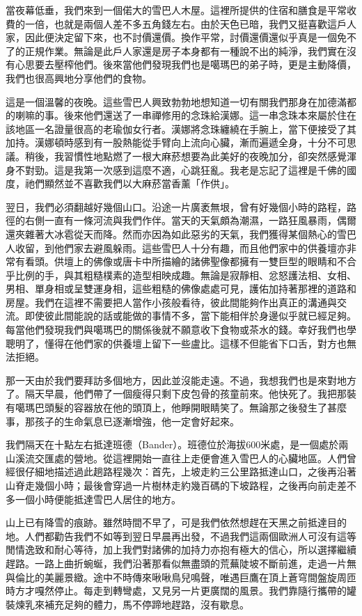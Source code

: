 當夜幕低垂，我們來到一個偌大的雪巴人木屋。這裡所提供的住宿和膳食是平常收費的一倍，也就是兩個人差不多五角錢左右。由於天色已暗，我們又挺喜歡這戶人家，因此便決定留下來，也不討價還價。換作平常，討價還價還似乎真是一個免不了的正規作業。無論是此戶人家還是房子本身都有一種說不出的純淨，我們實在沒有心思要去壓榨他們。後來當他們發現我們也是噶瑪巴的弟子時，更是主動降價，我們也很高興地分享他們的食物。

這是一個溫馨的夜晚。這些雪巴人興致勃勃地想知道一切有關我們那身在加德滿都的喇嘛的事。後來他們還送了一串禪修用的念珠給漢娜。這一串念珠本來屬於住在該地區一名證量很高的老瑜伽女行者。漢娜將念珠纏繞在手腕上，當下便接受了其加持。漢娜頓時感到有一股熱能從手臂向上流向心臟，漸而遍遞全身，十分不可思議。稍後，我習慣性地點燃了一根大麻菸想要為此美好的夜晚加分，卻突然感覺渾身不對勁。這是我第一次感到這麼不適，心跳狂亂。我老是忘記了這裡是千佛的國度，祂們顯然並不喜歡我們以大麻菸當香薰「作供」。

翌日，我們必須翻越好幾個山口。沿途一片廣袤無垠，曾有好幾個小時的路程，路徑的右側一直有一條河流與我們作伴。當天的天氣頗為潮濕，一路狂風暴雨，偶爾還夾雜著大冰雹從天而降。然而亦因為如此惡劣的天氣，我們獲得某個熱心的雪巴人收留，到他們家去避風躲雨。這些雪巴人十分有趣，而且他們家中的供養壇亦非常有看頭。供壇上的佛像或唐卡中所描繪的諸佛聖像都擁有一雙巨型的眼睛和不合乎比例的手，與其粗糙樸素的造型相映成趣。無論是寂靜相、忿怒護法相、女相、男相、單身相或呈雙運身相，這些粗糙的佛像處處可見，護佑加持著那裡的道路和房屋。我們在這裡不需要把人當作小孩般看待，彼此間能夠作出真正的溝通與交流。即使彼此間能說的話或能做的事情不多，當下能相伴於身邊似乎就已經足夠。每當他們發現我們與噶瑪巴的關係後就不願意收下食物或茶水的錢。幸好我們也學聰明了，懂得在他們家的供養壇上留下一些盧比。這樣不但能省下口舌，對方也無法拒絕。

那一天由於我們要拜訪多個地方，因此並沒能走遠。不過，我想我們也是來對地方了。隔天早晨，他們帶了一個瘦得只剩下皮包骨的孩童前來。他快死了。我把那裝有噶瑪巴頭髮的容器放在他的頭頂上，他睜開眼睛笑了。無論那之後發生了甚麼事，那孩子的生命氣息已逐漸增強，他一定會好起來。

我們隔天在十點左右抵達班德（Bander）。班德位於海拔600米處，是一個處於兩山溪流交匯處的營地。從這裡開始一直往上走便會進入雪巴人的心臟地區。人們曾經很仔細地描述過此趟路程幾次：首先，上坡走約三公里路抵達山口，之後再沿著山脊走幾個小時；最後會穿過一片樹林走約幾百碼的下坡路程，之後再向前走差不多一個小時便能抵達雪巴人居住的地方。

山上已有降雪的痕跡。雖然時間不早了，可是我們依然想趕在天黑之前抵達目的地。人們都勸告我們不如等到翌日早晨再出發，不過我們這兩個歐洲人可沒有這等閒情逸致和耐心等待，加上我們對諸佛的加持力亦抱有極大的信心，所以選擇繼續趕路。一路上曲折蜿蜒，我們沿著那看似無盡頭的荒蕪陡坡不斷前進，走過一片無與倫比的美麗景緻。途中不時傳來啾啾鳥兒鳴聲，唯遇巨鷹在頂上蒼穹間盤旋周匝時方才嘎然停止。每走到轉彎處，又見另一片更廣闊的風景。我們靠隨行攜帶的罐裝煉乳來補充足夠的體力，馬不停蹄地趕路，沒有歇息。


